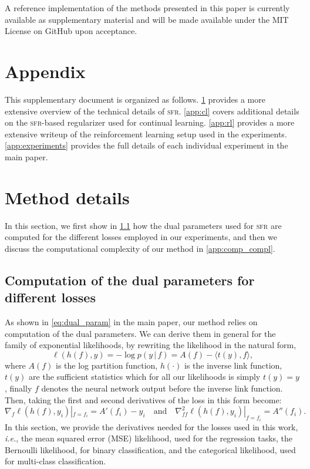 \documentclass{article} %
\makeatletter
\newcommand{\ie}{\textit{i.e.\@}\xspace}
\newcommand{\our}{\textsc{sfr}\xspace}
\renewcommand{\mid}{\,|\,}
\makeatother
\begin{document}
A reference implementation of the methods presented in this paper is currently available as supplementary material and will be made available under the MIT License on GitHub upon acceptance.


\newpage



\clearpage
\appendix
\section*{Appendix}

This supplementary document is organized as follows.
%
\cref{app:method} provides a more extensive overview of the technical details of \our.
%
\cref{app:cl} covers additional details on the \our-based regularizer used for continual learning.
%
\cref{app:rl} provides a more extensive writeup of the reinforcement learning setup used in the experiments.
%
\cref{app:experiments} provides the full details of each individual experiment in the main paper.


\section{Method details}
\label{app:method}
In this section, we first show in \cref{app:losses} how the dual parameters used for \our are computed for the different losses employed in our experiments, and then we discuss the computational complexity of our method in \cref{app:comp_compl}.
%

\subsection{Computation of the dual parameters for different losses}
\label{app:losses}
As shown in \cref{eq:dual_param} in the main paper, our method relies on computation of the dual parameters. We can derive them in general for the family of exponential likelihoods, by rewriting the likelihood in the natural form,
\begin{equation}
 \ell(h(f), y) = -\log p(y \mid f) =  A(f)  - \langle t(y), f \rangle,
\end{equation}
where $A(f)$ is the log partition function, $h(\cdot)$ is the inverse link function, $t(y)$ are the sufficient statistics which for all our likelihoods is simply $t(y)=y$, finally $f$ denotes the neural network output before the inverse link function.
Then, taking the first and second derivatives of the loss in this form become:
\begin{equation}\label{eq:dual_param_app}
  \nabla_{f}  \ell(h(f), y_i) |_{f=f_i} =  A'(f_i) - y_i
  \quad \text{and} \quad
  \nabla^2_{f\!f} \ell(h(f), y_i)  |_{f=f_i} = A''(f_i).
\end{equation}
In this section, we provide the derivatives needed for the losses used in this work, \ie, the mean squared error (MSE) likelihood, used for the regression tasks, the Bernoulli likelihood, for binary classification, and the categorical likelihood, used for multi-class classification.
\end{document}
